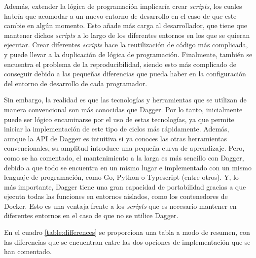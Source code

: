 Además, extender la lógica de programación implicaría crear \textit{scripts}, los cuales habría que acomodar a un nuevo entorno de desarrollo en el caso de que este cambie en algún momento. Esto añade más carga al desarrollador, que tiene que mantener dichos \textit{scripts} a lo largo de los diferentes entornos en los que se quieran ejecutar. Crear diferentes \textit{scripts} hace la reutilización de código más complicada, y puede llevar a la duplicación de lógica de programación. Finalmente, también se encuentra el problema de la reproducibilidad, siendo esto más complicado de conseguir debido a las pequeñas diferencias que pueda haber en la configuración del entorno de desarrollo de cada programador.

Sin embargo, la realidad es que las tecnologías y herramientas que se utilizan de manera convencional son más conocidas que Dagger. Por lo tanto, inicialmente puede ser lógico encaminarse por el uso de estas tecnologías, ya que permite iniciar la implementación de este tipo de ciclos más rápidamente. Además, aunque la API de Dagger es intuitiva si ya conoces las otras herramientas convencionales, su amplitud introduce una pequeña curva de aprendizaje. Pero, como se ha comentado, el mantenimiento a la larga es más sencillo con Dagger, debido a que todo se encuentra en un mismo lugar e implementado con un mismo lenguaje de programación, como Go, Python o Typescript (entre otros). Y, lo más importante, Dagger tiene una gran capacidad de portabilidad gracias a que ejecuta todas las funciones en entornos aislados, como los contenedores de Docker. Esto es una ventaja frente a los \textit{scripts} que es necesario mantener en diferentes entornos en el caso de que no se utilice Dagger.

En el cuadro \ref{table:differences} se proporciona una tabla a modo de resumen, con las diferencias que se encuentran entre las dos opciones de implementación que se han comentado.

